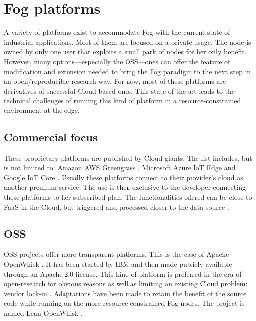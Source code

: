 \section{Fog platforms}
\label{sec:platforms}

A variety of platforms exist to accommodate Fog with the current state of industrial applications. Most of them are focused on a private usage. The node is owned by only one user that exploits a small park of nodes for her only benefit. However, many options—especially the \gls{OSS}—ones can offer the feature of modification and extension needed to bring the Fog paradigm to the next step in an open/reproducible research way. For now, most of these platforms are derivatives of successful Cloud-based ones. This state-of-the-art leads to the technical challenges of running this kind of platform in a resource-constrained environment at the edge.

\subsection{Commercial focus}

These proprietary platforms are published by Cloud giants. The list includes, but is not limited to: Amazon AWS Greengrass \cite{noauthor_aws_nodate}, Microsoft Azure IoT Edge \cite{noauthor_iot_nodate} and Google IoT Core \cite{noauthor_cloud_nodate}. Usually these platforms connect to their provider's cloud as another premium service. The use is then exclusive to the developer connecting these platforms to her subscribed plan. The functionalities offered can be close to \gls{FaaS} in the Cloud, but triggered and processed closer to the data source \cite{elgamal_costless_2018}.

\hypersetup{linkcolor=}
\subsection{\acrfull{OSS}}
\gls{OSS} projects offer more transparent platforms. This is the case of Apache OpenWhisk \cite{noauthor_apache_nodate}. It has been started by IBM and then made publicly available through an Apache 2.0 license. This kind of platform is preferred in the era of open-research for obvious reasons as well as limiting an existing Cloud problem: vendor lock-in \cite{kjorveziroski_iot_2021}. Adaptations have been made to retain the benefit of the source code while running on the more resource-constrained Fog nodes. The project is named Lean OpenWhisk \cite{breitgand_lean_2018}.

